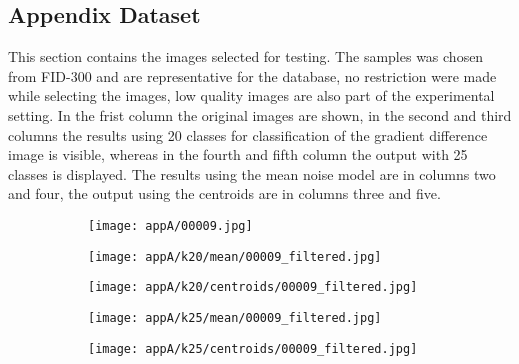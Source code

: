 \documentclass[draft,final]{vutinfth} %
\begin{document}

\cleardoublepage %







\begin{appendices}
		\chapter{Appendix Dataset}
		\label{AppA}
		This section contains the images selected for testing.
		The samples was chosen from FID-300 and are representative for the database, no restriction were made while selecting the images, low quality images are also part of the experimental setting.
		In the frist column the original images are shown, in the second and third columns the results using 20 classes for classification of the gradient difference image is visible, whereas in the fourth and fifth column the output with 25 classes is displayed.
		The results using the mean noise model are in columns two and four, the output using the centroids are in columns three and five.
\begin{figure}[h]
\centering
  \begin{subfigure}[t]{0.19\columnwidth}
    \centering
    \texttt{[image: appA/00009.jpg]}
  \end{subfigure}
  \begin{subfigure}[t]{0.19\columnwidth}
    \centering
    \texttt{[image: appA/k20/mean/00009\_filtered.jpg]}
  \end{subfigure}
  \begin{subfigure}[t]{0.19\columnwidth}
    \centering
    \texttt{[image: appA/k20/centroids/00009\_filtered.jpg]}
  \end{subfigure}
  \begin{subfigure}[t]{0.19\columnwidth}
    \centering
    \texttt{[image: appA/k25/mean/00009\_filtered.jpg]}
  \end{subfigure}
  \begin{subfigure}[t]{0.19\columnwidth}
    \centering
    \texttt{[image: appA/k25/centroids/00009\_filtered.jpg]}
  \end{subfigure}
\caption{}
\end{figure}  


\end{appendices}
\end{document}
